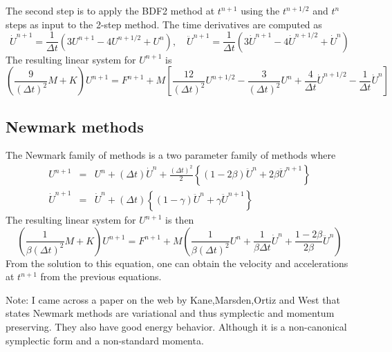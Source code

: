 \documentclass[12pt]{article}
\begin{document}
The second step is to apply the BDF2 method at $t^{n+1}$ using the $t^{n+1/2}$ and $t^n$ steps
as input to the 2-step method.  
The time derivatives are computed as
\begin{equation}
\label{eq:BDF2DDt}
\dot{U}^{n+1} = \frac{1}{\Delta t}\left( 3U^{n+1} -4U^{n+1/2} + U^n\right),
\quad
\ddot{U}^{n+1} = \frac{1}{\Delta t}\left( 3\dot{U}^{n+1} -4\dot{U}^{n+1/2} + \dot{U}^n\right)
\end{equation}
The resulting linear system for $U^{n+1}$ is
\begin{equation}
\left(\frac{9}{(\Delta t)^2} M + K \right) U^{n+1} = F^{n+1}
+ M\left[ \frac{12}{(\Delta t)^2} U^{n+1/2} - \frac{3}{(\Delta t)^2} U^{n}
+ \frac{4}{\Delta t} \dot{U}^{n+1/2} - \frac{1}{\Delta t} \dot{U}^{n}
\right]
\end{equation}

\subsection{Newmark methods}

The Newmark family of methods is a two parameter family of methods
where
\begin{eqnarray}
\label{eq:NewmarkMethod}
U^{n+1} &=& U^n + (\Delta t)\dot{U}^n + \frac{(\Delta t)^2}{2}\left\{
(1-2\beta) \ddot{U}^n + 2\beta \ddot{U}^{n+1}
\right\}
%
\\
%
\dot{U}^{n+1} &=& \dot{U}^n + (\Delta t)\left\{
(1-\gamma) \ddot{U}^n + \gamma \ddot{U}^{n+1}
\right\}
\end{eqnarray}
The resulting linear system for $U^{n+1}$ is then
\begin{equation}
\left(\frac{1}{\beta (\Delta t)^2} M + K \right)U^{n+1}
= F^{n+1} + M \left( 
\frac{1}{\beta (\Delta t)^2} U^n
+ \frac{1}{\beta \Delta t} \dot{U}^n
+ \frac{1-2\beta}{2\beta} \ddot{U}^n
\right)
\end{equation}
From the solution to this equation, one can obtain the 
velocity and accelerations at $t^{n+1}$ from the previous equations.

Note:  I came across a paper on the web by Kane,Marsden,Ortiz and West
that states Newmark methods are variational and thus symplectic and
momentum preserving.  They also have good energy behavior.  Although
it is a non-canonical symplectic form and a non-standard momenta.

\end{document}
